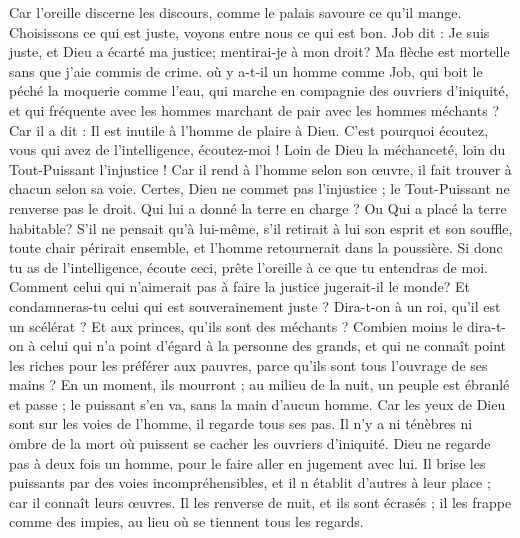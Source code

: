\begin{multicols}{2}
Car l'oreille discerne les discours, comme le palais savoure ce qu'il mange.
Choisissons ce qui est juste, voyons entre nous ce qui est bon.
Job dit : Je suis juste, et Dieu a écarté ma justice;
mentirai-je à mon droit? Ma flèche est mortelle sans que j'aie commis de crime.
où y a-t-il un homme comme Job, qui boit le péché la moquerie comme l'eau,
qui marche en compagnie des ouvriers d'iniquité, et qui fréquente  avec les hommes marchant de pair avec les hommes méchants ?
Car il a dit : Il est inutile à l'homme de plaire à Dieu.
 C'est pourquoi écoutez, vous qui avez de l'intelligence, écoutez-moi ! Loin de Dieu la méchanceté, loin du Tout-Puissant l'injustice !
Car il rend à l'homme selon son œuvre, il fait trouver à chacun selon sa voie.
Certes, Dieu ne commet pas l'injustice ; le Tout-Puissant ne renverse pas le droit.
Qui lui a donné la terre en charge ? Ou Qui a placé la terre habitable?
S'il ne pensait qu'à lui-même, s'il retirait à lui son esprit et son souffle,
toute chair périrait ensemble, et l'homme retournerait dans la poussière.
Si donc tu as de l'intelligence, écoute ceci, prête l'oreille à ce que tu entendras de moi.
Comment celui qui n'aimerait pas à faire la justice jugerait-il le monde? Et condamneras-tu celui qui est souverainement juste ?
Dira-t-on à un roi, qu'il est un scélérat ? Et aux princes, qu'ils sont des méchants ?
Combien moins le dira-t-on à celui qui n'a point d'égard à la personne des grands, et qui ne connaît point les riches pour les préférer aux pauvres, parce qu'ils sont tous l'ouvrage de ses mains ?
En un moment, ils mourront ; au milieu de la nuit, un peuple est ébranlé et passe ; le puissant s'en va, sans la main d'aucun homme.
Car les yeux de Dieu sont sur les voies de l'homme, il regarde tous ses pas.
Il n'y a ni ténèbres ni ombre de la mort où puissent se cacher les ouvriers d'iniquité.
Dieu ne regarde pas à deux fois un homme, pour le faire aller en jugement avec lui.
Il brise les puissants par des voies incompréhensibles, et il n établit d'autres à leur place ;
car il connaît leurs œuvres. Il les renverse de nuit, et ils sont écrasés ;
il les frappe comme des impies, au lieu où se tiennent tous les regards.

\end{multicols}
